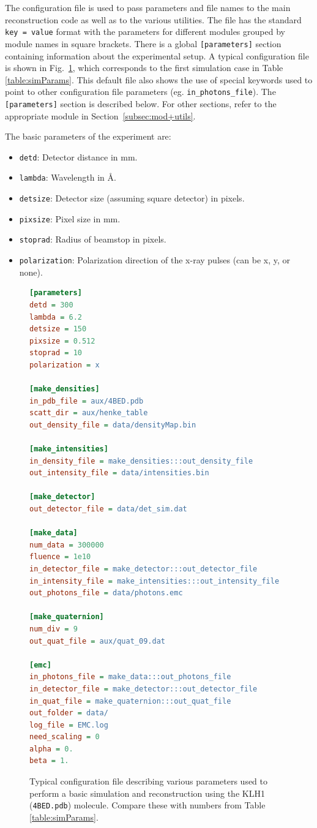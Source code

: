 \documentclass[preprint]{iucr}              %
\begin{document}
The configuration file is used to pass parameters and file names to the main reconstruction code as well as to the various utilities. The file has the standard \texttt{key = value} format with the parameters for different modules grouped by module names in square brackets. There is a global \texttt{[parameters]} section containing information about the experimental setup. A typical configuration file is shown in Fig.~\ref{fig:config}, which corresponds to the first simulation case in Table \ref{table:simParams}. This default file also shows the use of special keywords used to point to other configuration file parameters (eg. \texttt{in\_photons\_file}). The \texttt{[parameters]} section is described below. For other sections, refer to the appropriate module in Section~\ref{subsec:mod+utils}.

The basic parameters of the experiment are:
\begin{itemize}
\item \texttt{detd}: Detector distance in mm.
\item \texttt{lambda}: Wavelength in \AA.
\item \texttt{detsize}: Detector size (assuming square detector) in pixels.
\item \texttt{pixsize}: Pixel size in mm.
\item \texttt{stoprad}: Radius of beamstop in pixels.
\item \texttt{polarization}: Polarization direction of the x-ray pulses (can be x, y, or none).
\end{itemize}

\begin{figure}
\begin{lstlisting}[language=ini]
[parameters]
detd = 300
lambda = 6.2
detsize = 150
pixsize = 0.512
stoprad = 10
polarization = x

[make_densities]
in_pdb_file = aux/4BED.pdb
scatt_dir = aux/henke_table
out_density_file = data/densityMap.bin

[make_intensities]
in_density_file = make_densities:::out_density_file
out_intensity_file = data/intensities.bin

[make_detector]
out_detector_file = data/det_sim.dat

[make_data]
num_data = 300000
fluence = 1e10
in_detector_file = make_detector:::out_detector_file
in_intensity_file = make_intensities:::out_intensity_file
out_photons_file = data/photons.emc

[make_quaternion]
num_div = 9
out_quat_file = aux/quat_09.dat

[emc]
in_photons_file = make_data:::out_photons_file
in_detector_file = make_detector:::out_detector_file
in_quat_file = make_quaternion:::out_quat_file
out_folder = data/
log_file = EMC.log
need_scaling = 0
alpha = 0.
beta = 1.
\end{lstlisting}
\caption{Typical configuration file describing various parameters used to perform a basic simulation and reconstruction using the KLH1 (\texttt{4BED.pdb}) molecule. Compare these with numbers from Table \ref{table:simParams}.}
\label{fig:config}
\end{figure}
\end{document}
